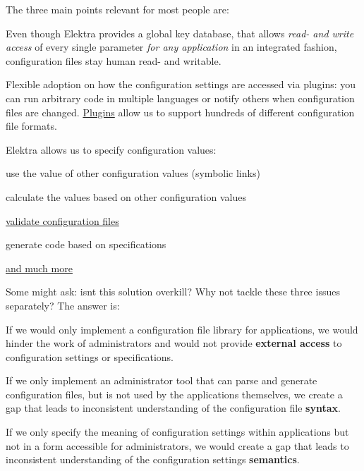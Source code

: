 The three main points relevant for most people are\+:


\begin{DoxyEnumerate}
\item Even though Elektra provides a global key database, that allows {\itshape read-\/ and write access} of every single parameter {\itshape for any application} in an integrated fashion, configuration files stay human read-\/ and writable.
\item Flexible adoption on how the configuration settings are accessed via plugins\+: you can run arbitrary code in multiple languages or notify others when configuration files are changed. \hyperlink{src_plugins_README_md}{Plugins} allow us to support hundreds of different configuration file formats.
\item Elektra allows us to specify configuration values\+:
\begin{DoxyItemize}
\item use the value of other configuration values (symbolic links)
\item calculate the values based on other configuration values
\item \hyperlink{doc_tutorials_validation_md}{validate configuration files}
\item generate code based on specifications
\item \hyperlink{src_plugins_README_md}{and much more}
\end{DoxyItemize}
\end{DoxyEnumerate}

Some might ask\+: isn\textquotesingle{}t this solution overkill? Why not tackle these three issues separately? The answer is\+:


\begin{DoxyEnumerate}
\item If we would only implement a configuration file library for applications, we would hinder the work of administrators and would not provide {\bfseries external access} to configuration settings or specifications.
\item If we only implement an administrator tool that can parse and generate configuration files, but is not used by the applications themselves, we create a gap that leads to inconsistent understanding of the configuration file {\bfseries syntax}.
\item If we only specify the meaning of configuration settings within applications but not in a form accessible for administrators, we would create a gap that leads to inconsistent understanding of the configuration settings\textquotesingle{} {\bfseries semantics}.
\end{DoxyEnumerate}


